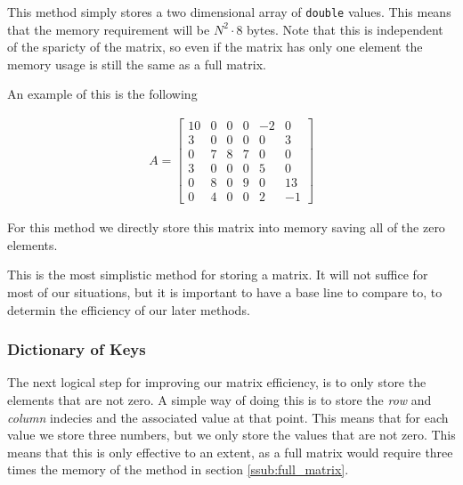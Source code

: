 \documentclass[../fem.tex]{subfiles}
\begin{document}
This method simply stores a two dimensional array of \texttt{double}
values. This means that the memory requirement will be $N^2\cdot 8$ bytes. Note
that this is independent of the sparicty of the matrix, so even if the matrix
has only one element the memory usage is still the same as a full matrix.

An example of this is the following

\begin{align*}
  A = \begin{bmatrix}
    10 & 0 & 0 & 0 & -2 & 0 \\
    3 & 0 & 0 & 0 & 0 & 3 \\
    0 & 7 & 8 & 7 & 0 & 0 \\
    3 & 0 & 0 & 0 & 5 & 0 \\
    0 & 8 & 0 & 9 & 0 & 13 \\
    0 & 4 & 0 & 0 & 2 & -1
  \end{bmatrix}
\end{align*}

For this method we directly store this matrix into memory saving all of the
zero elements.

This is the most simplistic method for storing a matrix. It will not suffice
for most of our situations, but it is important to have a base line to compare
to, to determin the efficiency of our later methods.

\begin{Figure}
  \begin{center}
  \end{center}
  \label{fig:mat_full}
\end{Figure}

\subsubsection{Dictionary of Keys}%
\label{ssub:dictionary_of_keys}

The next logical step for improving our matrix efficiency, is to only store the
elements that are not zero. A simple way of doing this is to store the
\textit{row} and \textit{column} indecies and the associated value at that
point. This means that for each value we store three numbers, but we only store
the values that are not zero. This means that this is only effective to an
extent, as a full matrix would require three times the memory of the method in
section \ref{ssub:full_matrix}.
\end{document}
